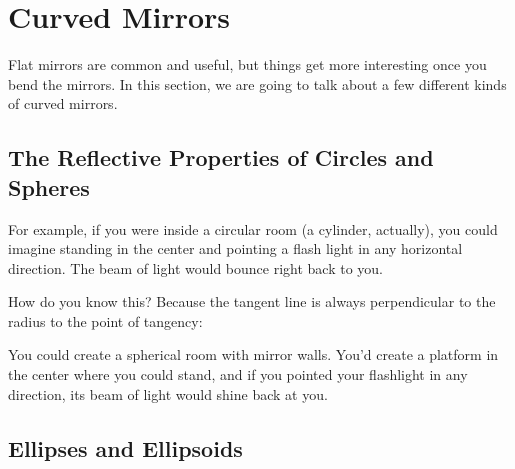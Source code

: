 \section{Curved Mirrors}

Flat mirrors are common and useful, but things get more interesting
once you bend the mirrors. In this section, we are going to talk about
a few different kinds of curved mirrors.

\subsection{The Reflective Properties of Circles and Spheres}

For example, if you were inside a circular room (a cylinder,
actually), you could imagine standing in the center and pointing a
flash light in any horizontal direction.  The beam of light would
bounce right back to you.


How do you know this?  Because the tangent line is always perpendicular to the radius to the point of tangency:


You could create a spherical room with mirror walls. You'd
create a platform in the center where you could stand, and if you
pointed your flashlight in any direction, its beam of light would
shine back at you.

\subsection{Ellipses and Ellipsoids}

